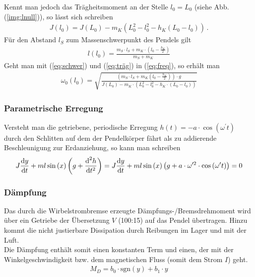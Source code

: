\documentclass[numbers=noenddot,12pt,a4paper]{scrartcl}
\newcommand{\diff}{\textnormal{d}}
\newcommand{\sgn}[1]{\text{sgn}\left(#1\right)}
\begin{document}
Kennt man jedoch das Trägheitsmoment an der Stelle $l_0=L_0$ (siehe Abb. (\ref{img:lnull})), so lässt sich schreiben
\begin{align}
J(l_0)=J(L_0)-m_K\left(L_0^2-l_0^2-h_K\left(L_0-l_0\right)\right) \, . \label{eq:träg}
\end{align}
Für den Abstand $l_S$ zum Massenschwerpunkt des Pendels gilt
\begin{align}
l(l_0)=\frac{m_S\cdot l_S + m_K \cdot \left( l_0- \frac{h_K}{2}\right)}{m_S+m_K} \label{eq:schwer}
\end{align}
Geht man mit (\ref{eq:schwer}) und (\ref{eq:träg}) in (\ref{eq:freq}), so erhält man
\begin{align}
\omega_0(l_0)=\sqrt{\frac{\left(m_S\cdot l_S+m_K\left(l_0-\frac{h_K}{2}\right)\right)\cdot g}{J(L_0)-m_K\cdot \left(L_0^2-l_0^2-h_K\cdot\left(L_0-l_0\right)\right)}}
\end{align}
\subsubsection{Parametrische Erregung}
Versteht man die getriebene, periodische Erregung $h(t)=-a\cdot \cos\left(\omega^\prime t\right)$ durch den Schlitten auf dem der Pendelkörper fährt als zu addierende Beschleunigung zur Erdanziehung, so kann man schreiben
\begin{align}
J\frac{\diff y}{\diff t}+ml\sin\left(x\right)\left(g+\frac{\diff^2 h}{\diff t^2}\right)=J\frac{\diff y}{\diff t}+ml\sin\left(x\right)\left(g+a\cdot \omega^{\prime 2}\cdot \cos\left(\omega^\prime t\right)\right)=0 \label{eq:err}
\end{align}
\subsubsection{Dämpfung}
Das durch die Wirbelstrombremse erzeugte Dämpfungs-/Bremsdrehmoment wird über ein Getriebe der Übersetzung $V$ (100:15) auf das Pendel übertragen. Hinzu kommt die nicht justierbare Dissipation durch Reibungen im Lager und mit der Luft.\\
Die Dämpfung enthält somit einen konstanten Term und einen, der mit der Winkelgeschwindigkeit bzw. dem magnetischen Fluss (somit dem Strom $I$) geht.
\begin{align}
M_D=b_0\cdot\sgn{y}+b_1\cdot y \label{eq:dämpf}
\end{align}
\end{document}
